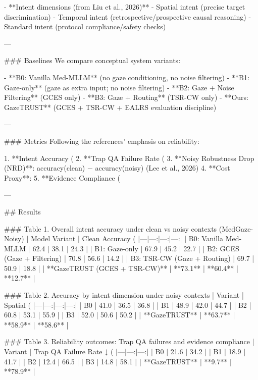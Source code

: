 - **Intent dimensions (from Liu et al., 2026)**
  - Spatial intent (precise target discrimination)
  - Temporal intent (retrospective/prospective causal reasoning)
  - Standard intent (protocol compliance/safety checks)

---

### Baselines  
We compare conceptual system variants:

- **B0: Vanilla Med-MLLM** (no gaze conditioning, no noise filtering)  
- **B1: Gaze-only** (gaze as extra input; no noise filtering)  
- **B2: Gaze + Noise Filtering** (GCES only)  
- **B3: Gaze + Routing** (TSR-CW only)  
- **Ours: GazeTRUST** (GCES + TSR-CW + EALRS evaluation discipline)

---

### Metrics  
Following the references’ emphasis on reliability:

1. **Intent Accuracy (%
2. **Trap QA Failure Rate (%
3. **Noisy Robustness Drop (NRD)**: accuracy(clean) − accuracy(noisy) (Lee et al., 2026)  
4. **Cost Proxy**: %
5. **Evidence Compliance (%

---

## Results  

### Table 1. Overall intent accuracy under clean vs noisy contexts (MedGaze-Noisy)  
| Model Variant | Clean Accuracy (%
|---|---:|---:|---:|
| B0: Vanilla Med-MLLM | 62.4 | 38.1 | 24.3 |
| B1: Gaze-only | 67.9 | 45.2 | 22.7 |
| B2: GCES (Gaze + Filtering) | 70.8 | 56.6 | 14.2 |
| B3: TSR-CW (Gaze + Routing) | 69.7 | 50.9 | 18.8 |
| **GazeTRUST (GCES + TSR-CW)** | **73.1** | **60.4** | **12.7** |

### Table 2. Accuracy by intent dimension under noisy contexts  
| Variant | Spatial (%
|---|---:|---:|---:|
| B0 | 41.0 | 36.5 | 36.8 |
| B1 | 48.9 | 42.0 | 44.7 |
| B2 | 60.8 | 53.1 | 55.9 |
| B3 | 52.0 | 50.6 | 50.2 |
| **GazeTRUST** | **63.7** | **58.9** | **58.6** |

### Table 3. Reliability outcomes: Trap QA failures and evidence compliance  
| Variant | Trap QA Failure Rate ↓ (%
|---|---:|---:|
| B0 | 21.6 | 34.2 |
| B1 | 18.9 | 41.7 |
| B2 | 12.4 | 66.5 |
| B3 | 14.8 | 58.1 |
| **GazeTRUST** | **9.7** | **78.9** |

